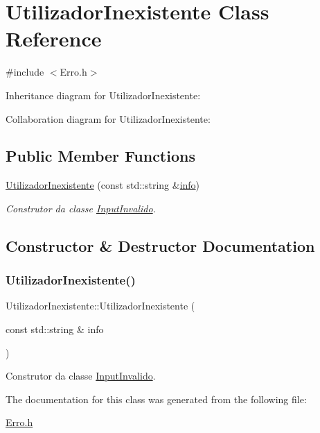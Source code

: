 \hypertarget{class_utilizador_inexistente}{}\section{Utilizador\+Inexistente Class Reference}
\label{class_utilizador_inexistente}


{\ttfamily \#include $<$Erro.\+h$>$}



Inheritance diagram for Utilizador\+Inexistente\+:


Collaboration diagram for Utilizador\+Inexistente\+:
\subsection*{Public Member Functions}
\begin{DoxyCompactItemize}
\item 
\mbox{\hyperlink{class_utilizador_inexistente_a66c90c46c5b2a33fa21fe40eb80cf2f8}{Utilizador\+Inexistente}} (const std\+::string \&\mbox{\hyperlink{class_erro_a3ecaaf6f8e15a0830a648035b456cb62}{info}})
\begin{DoxyCompactList}\small\item\em Construtor da classe \mbox{\hyperlink{class_input_invalido}{Input\+Invalido}}. \end{DoxyCompactList}\end{DoxyCompactItemize}


\subsection{Constructor \& Destructor Documentation}
\mbox{\label{class_utilizador_inexistente_a66c90c46c5b2a33fa21fe40eb80cf2f8}} 
\subsubsection{\texorpdfstring{Utilizador\+Inexistente()}{UtilizadorInexistente()}}
{\footnotesize\ttfamily Utilizador\+Inexistente\+::\+Utilizador\+Inexistente (\begin{DoxyParamCaption}\item[{const std\+::string \&}]{info }\end{DoxyParamCaption})\hspace{0.3cm}{\ttfamily [inline]}}



Construtor da classe \mbox{\hyperlink{class_input_invalido}{Input\+Invalido}}. 



The documentation for this class was generated from the following file\+:\begin{DoxyCompactItemize}
\item 
\mbox{\hyperlink{_erro_8h}{Erro.\+h}}\end{DoxyCompactItemize}
